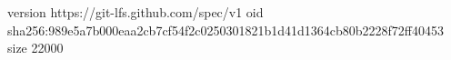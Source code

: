 version https://git-lfs.github.com/spec/v1
oid sha256:989e5a7b000eaa2cb7cf54f2c0250301821b1d41d1364cb80b2228f72ff40453
size 22000
